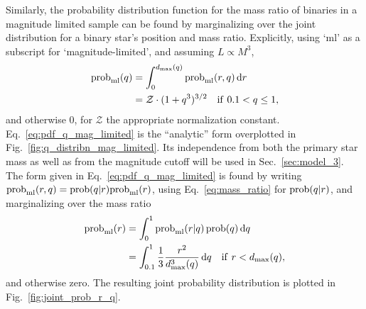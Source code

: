 \documentclass{emulateapj}
\begin{document}
Similarly, the probability distribution function for the mass ratio of binaries 
in a magnitude limited sample can be found by marginalizing over the joint 
distribution for a binary star's position and mass ratio.
Explicitly, using `ml' as a subscript for `magnitude-limited', and assuming 
$L\propto M^3$,
\begin{align}
{\rm prob}_{\rm ml}(q) &= 
	\int_{0}^{d_{\rm max}(q)} {\rm prob}_{\rm ml}(r,q) \,{\rm d}r \\
&= \mathcal{Z}\cdot (1+q^3)^{3/2}\quad {\rm if\ }0.1<q\leq 1,
\label{eq:pdf_q_mag_limited}
\end{align}
and otherwise 0, for $\mathcal{Z}$ the appropriate normalization constant.
Eq.~\ref{eq:pdf_q_mag_limited} is the ``analytic'' form overplotted in 
Fig.~\ref{fig:q_distribn_mag_limited}. Its independence from both the primary 
star mass as well as from the magnitude cutoff will be used in 
Sec.~\ref{sec:model_3}.
The form given in Eq.~\ref{eq:pdf_q_mag_limited} is found by writing 
${\rm prob}_{\rm ml}(r,q) = {\rm prob}(q|r){\rm prob}_{\rm ml}(r)$, using 
Eq.~\ref{eq:mass_ratio} for ${\rm prob}(q|r)$, and marginalizing over the mass 
ratio
\begin{align}
{\rm prob}_{\rm ml}(r) &= \int_{0}^{1} {\rm prob}_{\rm ml}(r|q)\,{\rm 
prob}(q)\,{\rm d}q
\\
&= \int_{0.1}^{1} \frac{1}{3} \frac{r^2}{d_{\rm max}^3(q)}\,{\rm d}q
\quad {\rm if\ }r<d_{\rm max}(q),
\end{align}
and otherwise zero. The resulting joint probability distribution is plotted in 
Fig.~\ref{fig:joint_prob_r_q}.
\end{document}
